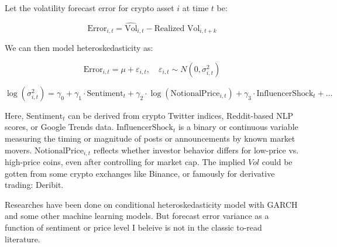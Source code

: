 Let the volatility forecast error for crypto asset $i$ at time $t$ be:

\begin{equation}
\text{Error}_{i,t} = \widehat{\text{Vol}}_{i,t} - \text{Realized Vol}_{i,t+k}
\end{equation}

We can then model heteroskedasticity as:

\begin{equation}
\text{Error}_{i,t} = \mu + \varepsilon_{i,t}, \quad \varepsilon_{i,t} \sim N(0, \sigma_{i,t}^2)
\end{equation}

\begin{equation}
\log(\sigma_{i,t}^2) = \gamma_0 + \gamma_1 \cdot \text{Sentiment}_{t} + \gamma_2 \cdot \log(\text{NotionalPrice}_{i,t}) + \gamma_3 \cdot \text{InfluencerShock}_{t} + \ldots
\end{equation}

Here, $\text{Sentiment}_{t}$ can be derived from crypto Twitter indices, Reddit-based NLP scores, or Google Trends data. $\text{InfluencerShock}_{t}$ is a binary or continuous variable measuring the timing or magnitude of posts or announcements by known market movers. $\text{NotionalPrice}_{i,t}$ reflects whether investor behavior differs for low-price vs. high-price coins, even after controlling for market cap.
The implied $Vol$ could be gotten from some crypto exchanges like Binance, or famously for derivative trading: Deribit. 

Researches have been done on conditional heteroskedasticity model with GARCH and some other machine learning models. But forecast error variance as a function of sentiment or price level I beleive is not in the classic to-read literature.

